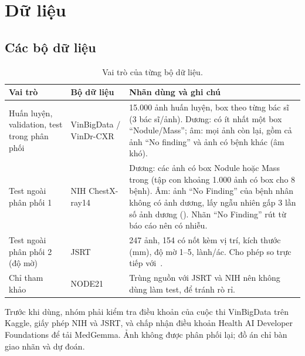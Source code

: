 \clearpage
\section{Dữ liệu}
\label{sec:data}

\subsection{Các bộ dữ liệu}

\begin{table}[H]
\centering
\caption{Vai trò của từng bộ dữ liệu.}
\label{tab:datasets}
\small
\begin{tabularx}{\textwidth}{@{}p{2.9cm} p{3.2cm} L@{}}
\toprule
\textbf{Vai trò} & \textbf{Bộ dữ liệu} & \textbf{Nhãn dùng và ghi chú} \\
\midrule
Huấn luyện, validation, test trong phân phối & VinBigData / VinDr-CXR~\cite{nguyen2022vindr} & 15.000 ảnh huấn
luyện, box theo từng bác sĩ (3 bác sĩ/ảnh). Dương: có ít nhất một box ``Nodule/Mass''; âm: mọi ảnh còn lại, gồm
cả ảnh ``No finding'' và ảnh có bệnh khác (âm khó). \\
\addlinespace
Test ngoài phân phối 1 & NIH ChestX-ray14~\cite{wang2017chestxray8} & Dương: các ảnh có box Nodule hoặc Mass
trong  (tập con khoảng 1.000 ảnh có box cho 8 bệnh). Âm: ảnh ``No Finding'' của
bệnh nhân không có ảnh dương, lấy ngẫu nhiên gấp 3 lần số ảnh dương (). Nhãn ``No Finding''
rút từ báo cáo nên có nhiễu. \\
\addlinespace
Test ngoài phân phối 2 (độ mờ) & JSRT~\cite{shiraishi2000jsrt} & 247 ảnh, 154 có nốt kèm vị trí, kích thước
(mm), độ mờ 1--5, lành/ác. Cho phép so trực tiếp với~\cite{nishio2026zeroshot}. \\
\addlinespace
Chỉ tham khảo & NODE21~\cite{sogancioglu2024node21} & Trùng nguồn với JSRT và NIH nên không dùng làm test, để tránh rò rỉ. \\
\bottomrule
\end{tabularx}
\end{table}

Trước khi dùng, nhóm phải kiểm tra điều khoản của cuộc thi VinBigData trên Kaggle, giấy phép NIH và JSRT, và
chấp nhận điều khoản Health AI Developer Foundations để tải MedGemma. Ảnh không được phân phối lại; đồ án chỉ bàn
giao nhãn và dự đoán.


